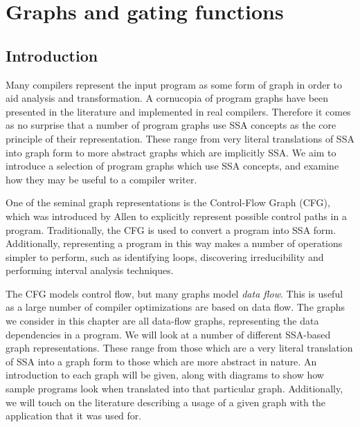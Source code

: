 \chapter{Graphs and gating functions }
\label{chapter:vsdg}


\newcommand{\Gn}{$\gamma$-node}
\newcommand{\Gns}{$\gamma$-nodes}
\newcommand{\Tn}{$\theta$-node}
\newcommand{\Tns}{$\theta$-nodes}
\newcommand{\Ttns}{$\theta^{\mathit{tail}}$-nodes}
\newcommand{\triVM}{\textit{tri}VM}

\newcommand{\instruction}[1]{\texttt{#1}}
\newcommand{\register}[1]{\texttt{v#1}}

\section{Introduction}

Many compilers represent the input program as some form of graph in order to aid analysis and transformation. A cornucopia of program graphs have been presented in the literature and implemented in real compilers. Therefore it comes as no surprise that a number of program graphs use SSA concepts as the core principle of their representation. These range from very literal translations of SSA into graph form to more abstract graphs which are implicitly SSA. We aim to introduce a selection of program graphs which use SSA concepts, and examine how they may be useful to a compiler writer.

One of the seminal graph representations is the Control-Flow Graph (CFG), which was introduced by Allen to explicitly represent possible control paths in a program. Traditionally, the CFG is used to convert a program into SSA form. Additionally, representing a program in this way makes a number of operations simpler to perform, such as identifying loops, discovering irreducibility and performing interval analysis techniques.

The CFG models control flow, but many graphs model \textit{data flow}. This is useful as a large number of compiler optimizations are based on data flow. The graphs we consider in this chapter are all data-flow graphs, representing the data dependencies in a program. We will look at a number of different SSA-based graph representations. These range from those which are a very literal translation of SSA into a graph form to those which are more abstract in nature. An introduction to each graph will be given, along with diagrams to show how sample programs look when translated into that particular graph. Additionally, we will touch on the literature describing a usage of a given graph with the application that it was used for.

